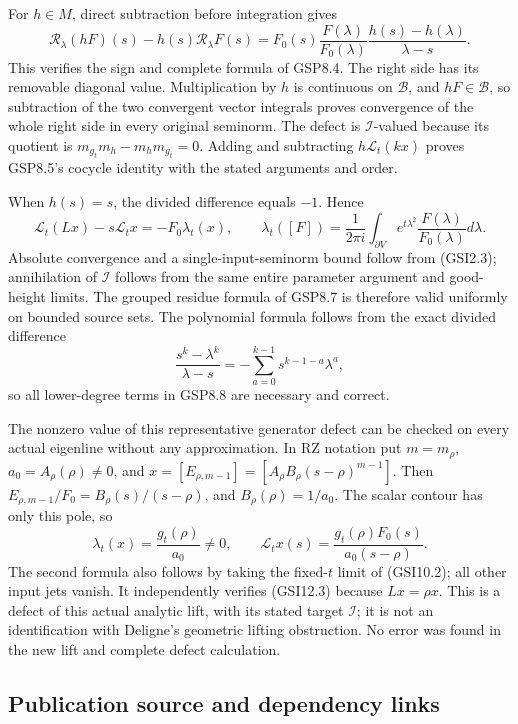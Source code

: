 For \(h\in M\), direct subtraction before integration gives \[
\mathscr R_\lambda(hF)(s)-h(s)\mathscr R_\lambda F(s)
=F_0(s)\frac{F(\lambda)}{F_0(\lambda)}
\frac{h(s)-h(\lambda)}{\lambda-s}.
\tag{GSI12.2}
\] This verifies the sign and complete formula of GSP8.4. The right side
has its removable diagonal value. Multiplication by \(h\) is continuous
on \(\mathcal B\), and \(hF\in\mathcal B\), so subtraction of the two
convergent vector integrals proves convergence of the whole right side
in every original seminorm. The defect is \(\mathcal I\)-valued because
its quotient is \(m_{g_t}m_h-m_hm_{g_t}=0\). Adding and subtracting
\(h\mathcal L_t(kx)\) proves GSP8.5's cocycle identity with the stated
arguments and order.

When \(h(s)=s\), the divided difference equals \(-1\). Hence \[
\mathcal L_t(Lx)-s\mathcal L_tx=-F_0\lambda_t(x),
\qquad
\lambda_t([F])=\frac1{2\pi i}\int_{\partial V}
e^{t\lambda^2}\frac{F(\lambda)}{F_0(\lambda)}d\lambda.
\tag{GSI12.3}
\] Absolute convergence and a single-input-seminorm bound follow from
(GSI2.3); annihilation of \(\mathcal I\) follows from the same entire
parameter argument and good-height limits. The grouped residue formula
of GSP8.7 is therefore valid uniformly on bounded source sets. The
polynomial formula follows from the exact divided difference \[
\frac{s^k-\lambda^k}{\lambda-s}
=-\sum_{a=0}^{k-1}s^{k-1-a}\lambda^a,
\tag{GSI12.4}
\] so all lower-degree terms in GSP8.8 are necessary and correct.

The nonzero value of this representative generator defect can be checked
on every actual eigenline without any approximation. In RZ notation put
\(m=m_\rho\), \(a_0=A_\rho(\rho)\ne0\), and
\(x=[E_{\rho,m-1}]=[A_\rho B_\rho(s-\rho)^{m-1}]\). Then
\(E_{\rho,m-1}/F_0=B_\rho(s)/(s-\rho)\), and \(B_\rho(\rho)=1/a_0\). The
scalar contour has only this pole, so \[
\lambda_t(x)=\frac{g_t(\rho)}{a_0}\ne0,
\qquad
\mathcal L_tx(s)=\frac{g_t(\rho)F_0(s)}{a_0(s-\rho)}.
\tag{GSI12.5}
\] The second formula also follows by taking the fixed-\(t\) limit of
(GSI10.2); all other input jets vanish. It independently verifies
(GSI12.3) because \(Lx=\rho x\). This is a defect of this actual
analytic lift, with its stated target \(\mathcal I\); it is not an
identification with Deligne's geometric lifting obstruction. No error
was found in the new lift and complete defect calculation.

\subsection{Publication source and dependency
links}\label{publication-source-and-dependency-links}


